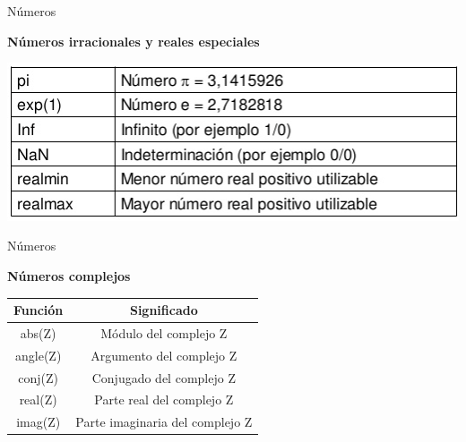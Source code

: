 \documentclass{bredelebeamer}
\begin{document}
\begin{frame}{Números}
\begin{center}
\textbf{Números irracionales y reales especiales}
\end{center}
\begin{center}
\includegraphics[scale=0.6]{images/irracionales.png}
\end{center}
\end{frame}

\begin{frame}{Números}
\begin{center}
\textbf{Números complejos}\\
\end{center}
\begin{table}[]
\centering
\begin{tabular}{|c|c|}
\hline
Función  & Significado                     \\ \hline
abs(Z)   & Módulo del complejo Z          \\ \hline
angle(Z) & Argumento del complejo Z        \\ \hline
conj(Z)  & Conjugado del complejo Z        \\ \hline
real(Z)  & Parte real del complejo Z       \\ \hline
imag(Z)  & Parte imaginaria del complejo Z \\ \hline
\end{tabular}
\end{table}
\end{frame}
\end{document}
